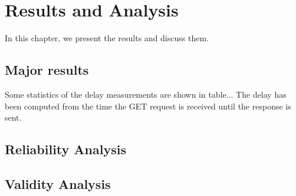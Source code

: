 \chapter{Results and Analysis}
\label{ch:resultsAndAnalysis}


In this chapter, we present the results and discuss them.


\section{Major results}

Some statistics of the delay measurements are shown in table... The delay has been computed from the time the GET request is received until the response is sent.


\section{Reliability Analysis}


\section{Validity Analysis}


\cleardoublepage
